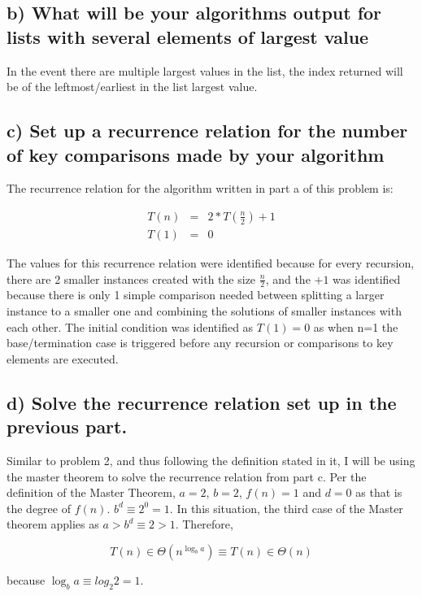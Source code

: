 \documentclass[11pt]{article}
\begin{document}
\subsection*{b) What will be your algorithms output for lists with several elements of largest value}


\bigskip
In the event there are multiple largest values in the list, the index returned will be of the leftmost/earliest in the list largest value.


\subsection*{c) Set up a recurrence relation for the number of key comparisons made by your algorithm}

\bigskip
\bigskip
The recurrence relation for the algorithm written in part a of this problem is:

\begin{eqnarray*}
T(n) &=& 2*T(\frac{n}{2}) +1 \\
T(1) &=& 0
\end{eqnarray*}

\bigskip

The values for this recurrence relation were identified because for every recursion, there are 2 smaller instances created with the size $\frac{n}{2}$, and the $+1$ was identified because there is only 1 simple comparison needed between splitting a larger instance to a smaller one and combining the solutions of smaller instances with each other. The initial condition was identified as $T(1)=0$ as when n=1 the base/termination case is triggered before any recursion or comparisons to key elements are executed.


\subsection*{d) Solve the recurrence relation set up in the previous part.}

\bigskip
\bigskip
Similar to problem 2, and thus following the definition stated in it, I will be using the master theorem to solve the recurrence relation from part c. Per the definition of the Master Theorem, $a=2$, $b=2$, $f(n)=1$ and $d=0$ as that is the degree of $f(n)$. $b^d \equiv 2^0=1$. In this situation, the third case of the Master theorem applies as $a>b^d \equiv 2>1$. Therefore, 

\begin{equation*}
T(n) \in \Theta (n^{\log_b a}) \equiv T(n) \in \Theta (n)
\end{equation*}

\noindent because $\log_b a \equiv log_2 2 = 1$.




\end{document}
